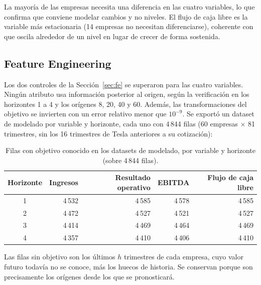 \documentclass[12pt,letterpaper,oneside]{report}
\renewcommand{\_}{\UnderscoreOriginal\allowbreak}
\begin{document}
La mayoría de las empresas necesita una diferencia en las cuatro variables, lo que confirma que conviene modelar cambios y no niveles. El flujo de caja libre es la variable más estacionaria (14 empresas no necesitan diferenciarse), coherente con que oscila alrededor de un nivel en lugar de crecer de forma sostenida.

\subsection{Feature Engineering}
\label{sec:res-fe}

Los dos controles de la Sección~\ref{sec:fe} se superaron para las cuatro variables. Ningún atributo usa información posterior al origen, según la verificación en los horizontes 1 a 4 y los orígenes 8, 20, 40 y 60. Además, las transformaciones del objetivo se invierten con un error relativo menor que $10^{-9}$. Se exportó un dataset de modelado por variable y horizonte, cada uno con 4\,844 filas (60 empresas $\times$ 81 trimestres, sin los 16 trimestres de Tesla anteriores a su cotización):

\begin{table}[H]
\centering
\caption{Filas con objetivo conocido en los datasets de modelado, por variable y horizonte (sobre 4\,844 filas).}
\label{tab:export}
\begin{tabular}{@{}crrrr@{}}
\toprule
Horizonte & Ingresos & Resultado operativo & EBITDA & Flujo de caja libre \\
\midrule
1 & 4\,532 & 4\,585 & 4\,578 & 4\,585 \\
2 & 4\,472 & 4\,527 & 4\,521 & 4\,527 \\
3 & 4\,414 & 4\,469 & 4\,464 & 4\,469 \\
4 & 4\,357 & 4\,410 & 4\,406 & 4\,410 \\
\bottomrule
\end{tabular}
\end{table}

Las filas sin objetivo son los últimos $h$ trimestres de cada empresa, cuyo valor futuro todavía no se conoce, más los huecos de historia. Se conservan porque son precisamente los orígenes desde los que se pronosticará.
\end{document}
